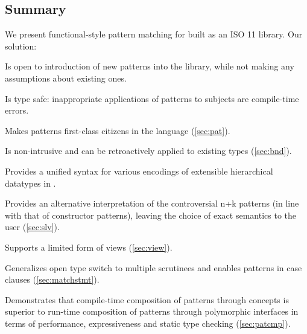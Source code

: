 \subsection{Summary}

We present functional-style pattern matching for \Cpp{} built as an ISO 
\Cpp{}11 library. Our solution:

\begin{compactitem}
\setlength{\itemsep}{0pt}
\setlength{\parskip}{0pt}
  \item Is open to introduction of new patterns into the library, while not 
        making any assumptions about existing ones.
  \item Is type safe: inappropriate applications of patterns to subjects are compile-time errors.
  \item Makes patterns first-class citizens in the language (\textsection\ref{sec:pat}).
  \item Is non-intrusive and can be retroactively applied to existing types (\textsection\ref{sec:bnd}).
\item Provides a unified syntax for various encodings of extensible 
       hierarchical datatypes in \Cpp{}.
  \item Provides an alternative interpretation of the controversial n+k 
        patterns (in line with that of constructor patterns), leaving the choice 
        of exact semantics to the user (\textsection\ref{sec:slv}).
  \item Supports a limited form of views (\textsection\ref{sec:view}).
  \item Generalizes open type switch to multiple scrutinees and enables patterns 
        in case clauses (\textsection\ref{sec:matchstmt}).
  \item Demonstrates that compile-time composition of patterns through 
        concepts is superior to run-time composition of patterns through 
        polymorphic interfaces in terms of performance, expressiveness and 
        static type checking (\textsection\ref{sec:patcmp}).
\end{compactitem}



